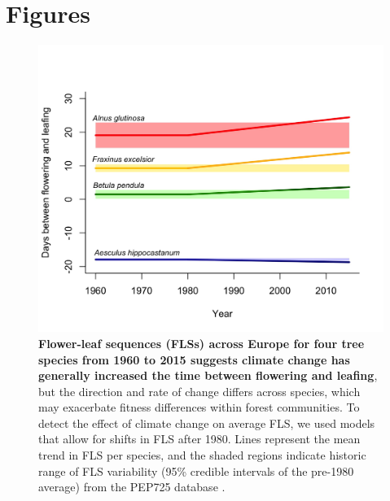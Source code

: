 \documentclass[11pt]{article}
\begin{document}
\section*{Figures}


\begin{figure}[h!]
    \centering
 \includegraphics[width=\textwidth]{..//PEP725/FLS_climate_change.jpeg} 
    \caption{\textbf{Flower-leaf sequences (FLSs) across Europe for four tree species from 1960 to 2015 suggests climate change has generally increased the time between flowering and leafing}, but the direction and rate of change differs across species, which may exacerbate fitness differences within forest communities. To detect the effect of climate change on average FLS, we used models that allow for shifts in FLS after 1980. Lines represent the mean trend in FLS per species, and the shaded regions indicate historic range of FLS variability (95\% credible intervals of the pre-1980 average) from the PEP725 database \citep{PEP725}.}
    \label{fig:climchange}
\end{figure}
\end{document}
